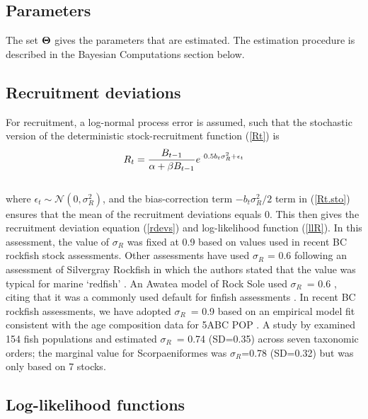 \documentclass[11pt]{book}
\newcommand{\Norm}{\mathcal{N}}%
\def\bfTh{{\bf \Theta}}%
\def\minus{%
  \setbox0=\hbox{-}%
  \vcenter{%
    \hrule width\wd0 height 0.05pt%
  }%
}
\def\bfTh{{\bf \Theta}}          %
\def\vsd{\vspace*{1ex}}     %
\newcommand{\eref}[1]{(\ref{#1})}
\renewcommand{\eb}{\vsd \vsd \begin{eqnarray}}
\renewcommand{\ee}{\end{eqnarray} \vsd }
\begin{document}
\subsection{Parameters}

The set $\bfTh$ gives the parameters that are estimated. 
The estimation procedure is described in the Bayesian Computations section below.

\subsection{Recruitment deviations}

For recruitment, a log-normal process error is assumed, such that the stochastic version of the deterministic stock-recruitment function (\ref{Rt}) is
\eb
R_t = \frac{B_{t-1}}{\alpha + \beta B_{t-1}} e^{\minus 0.5 b_t \sigma_R^2 + \epsilon_t} \label{Rt.sto}
\ee \\[-0.25ex]


where $\epsilon_t \sim \Norm(0, \sigma_R^2)$, and the bias-correction term $-b_t \sigma_R^2/2$ term in \eref{Rt.sto} ensures that the mean of the recruitment deviations equals 0. 
This then gives the recruitment deviation equation (\ref{rdevs}) and log-likelihood function (\ref{llR}). 
In this assessment, the value of $\sigma_R$ was fixed at 0.9 based on values used in recent BC rockfish stock assessments.
Other assessments have used $\sigma_R$ = 0.6 following an assessment of Silvergray Rockfish \citep{Starr-etal:2016_sgr} in which the authors stated that the value was typical for marine `redfish' \citep{Mertz-Myers:1996}.
An Awatea model of Rock Sole used $\sigma_R$~= 0.6 \citep{Holt-etal:2016_rol}, citing that it was a commonly used default for finfish assessments \citep{Beddington-Cooke:1983}.
In recent BC rockfish assessments, we have adopted $\sigma_R$~= 0.9 based on an empirical model fit consistent with the age composition data for 5ABC POP \citep{Edwards-etal:2012_pop5ABC}.
A study by \citet{Thorson-etal:2014} examined 154 fish populations and estimated $\sigma_R$~= 0.74 (SD=0.35) across seven taxonomic orders; the marginal value for Scorpaeniformes was $\sigma_R$=0.78 (SD=0.32) but was only based on 7 stocks.

\subsection{Log-likelihood functions}
\end{document}
